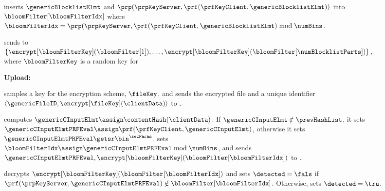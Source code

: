 \begin{figure}
{\begin{minipage}[t]{\textwidth}
\item \label{pre:bloom_filter_assign} \server inserts $\genericBlocklistElmt$ and $\prp(\prpKeyServer, \prf(\prfKeyClient,\genericBlocklistElmt))$ into $\bloomFilter[\bloomFilterIdx]$ where $\bloomFilterIdx = \prp(\prpKeyServer, \prf(\prfKeyClient,\genericBlocklistElmt) \bmod \numBins$. 



\item \label{pre:encrypt_filter} \server sends to \client $\{\encrypt[\bloomFilterKey](\bloomFilter[1]), \dots, \encrypt[\bloomFilterKey](\bloomFilter[\numBlocklistParts])\}$, where  $\bloomFilterKey$ is a random key for \encryptionScheme

\protocolStepListEnd


\smallskip\noindent\textbf{Upload:} 



\item \client samples a key for the encryption scheme, $\fileKey$, and sends the encrypted file and a unique identifier $\langle \genericFileID, \encrypt[\fileKey](\clientData)\rangle$ to \server. 

\item \label{upload:bloom_filter_idx} \client computes $\genericCInputElmt \assign \contentHash(\clientData)$. If $\genericCInputElmt \notin \prevHashList$, it sets $\genericCInputElmtPRFEval \assign \prf(\prfKeyClient, \genericCInputElmt)$, otherwise it sets $\genericCInputElmtPRFEval \getsr \bin^{\secParam}$. \client sets $\bloomFilterIdx \assign \genericCInputElmtPRFEval \bmod \numBins$, and sends $\genericCInputElmtPRFEval, \encrypt[\bloomFilterKey](\bloomFilter[\bloomFilterIdx])$ to \server. 

\item \label{upload:fast_path_1} \server decrypts $\encrypt[\bloomFilterKey](\bloomFilter[\bloomFilterIdx])$ and sets $\detected = \fals$ if $\prf(\prpKeyServer,\genericCInputElmtPRFEval) \notin \bloomFilter[\bloomFilterIdx]$. Otherwise, \server sets $\detected = \tru$. 



\end{minipage}}
\end{figure}
